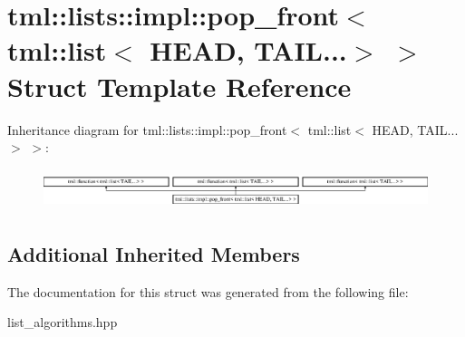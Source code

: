 \hypertarget{structtml_1_1lists_1_1impl_1_1pop__front_3_01tml_1_1list_3_01HEAD_00_01TAIL_8_8_8_4_01_4}{\section{tml\+:\+:lists\+:\+:impl\+:\+:pop\+\_\+front$<$ tml\+:\+:list$<$ H\+E\+A\+D, T\+A\+I\+L...$>$ $>$ Struct Template Reference}
\label{structtml_1_1lists_1_1impl_1_1pop__front_3_01tml_1_1list_3_01HEAD_00_01TAIL_8_8_8_4_01_4}
}
Inheritance diagram for tml\+:\+:lists\+:\+:impl\+:\+:pop\+\_\+front$<$ tml\+:\+:list$<$ H\+E\+A\+D, T\+A\+I\+L...$>$ $>$\+:\begin{figure}[H]
\begin{center}
\leavevmode
\includegraphics[height=1.200429cm]{structtml_1_1lists_1_1impl_1_1pop__front_3_01tml_1_1list_3_01HEAD_00_01TAIL_8_8_8_4_01_4}
\end{center}
\end{figure}
\subsection*{Additional Inherited Members}


The documentation for this struct was generated from the following file\+:\begin{DoxyCompactItemize}
\item 
list\+\_\+algorithms.\+hpp\end{DoxyCompactItemize}
